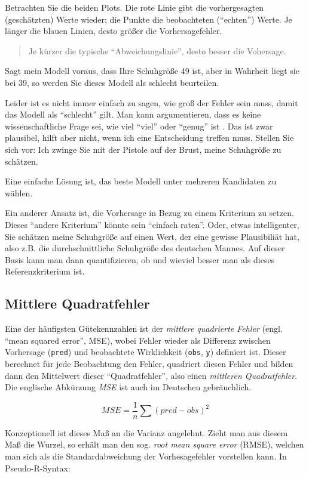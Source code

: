 \documentclass[12pt,ngerman,]{book}
\begin{document}
Betrachten Sie die beiden Plots. Die rote Linie gibt die vorhergesagten
(geschätzten) Werte wieder; die Punkte die beobachteten (``echten'')
Werte. Je länger die blauen Linien, desto größer die Vorhersagefehler.

\begin{quote}
Je kürzer die typische ``Abweichungslinie'', desto besser die Vohersage.
\end{quote}

Sagt mein Modell voraus, dass Ihre Schuhgröße 49 ist, aber in Wahrheit
liegt sie bei 39, so werden Sie dieses Modell als schlecht beurteilen.

Leider ist es nicht immer einfach zu sagen, wie groß der Fehler sein
muss, damit das Modell als ``schlecht'' gilt. Man kann argumentieren,
dass es keine wissenschaftliche Frage sei, wie viel ``viel'' oder
``genug'' ist \citep{uncertainty}. Das ist zwar plausibel, hilft aber
nicht, wenn ich eine Entscheidung treffen muss. Stellen Sie sich vor:
Ich zwinge Sie mit der Pistole auf der Brust, meine Schuhgröße zu
schätzen.

Eine einfache Lösung ist, das beste Modell unter mehreren Kandidaten zu
wählen.

Ein anderer Ansatz ist, die Vorhersage in Bezug zu einem Kriterium zu
setzen. Dieses ``andere Kriterium'' könnte sein ``einfach raten''. Oder,
etwas intelligenter, Sie schätzen meine Schuhgröße auf einen Wert, der
eine gewisse Plausibiliät hat, also z.B. die durchschnittliche
Schuhgröße des deutschen Mannes. Auf dieser Basis kann man dann
quantifizieren, ob und wieviel besser man als dieses Referenzkriterium
ist.

\subsection{Mittlere Quadratfehler}\label{mittlere-quadratfehler}

Eine der häufigsten Gütekennzahlen ist der \emph{mittlere quadrierte
Fehler} (engl. ``mean squared error'', MSE), wobei Fehler wieder als
Differenz zwischen Vorhersage (\texttt{pred}) und beobachtete
Wirklichkeit (\texttt{obs}, \texttt{y}) definiert ist. Dieser berechnet
für jede Beobachtung den Fehler, quadriert diesen Fehler und bilden dann
den Mittelwert dieser ``Quadratfehler'', also einen \emph{mittleren
Quadratfehler}. Die englische Abkürzung \emph{MSE} ist auch im Deutschen
gebräuchlich.

\[ MSE = \frac{1}{n} \sum{(pred - obs)^2} \]

Konzeptionell ist dieses Maß an die Varianz angelehnt. Zieht man aus
diesem Maß die Wurzel, so erhält man den sog. \emph{root mean square
error} (RMSE), welchen man sich als die Standardabweichung der
Vorhesagefehler vorstellen kann. In Pseudo-R-Syntax:
\end{document}
